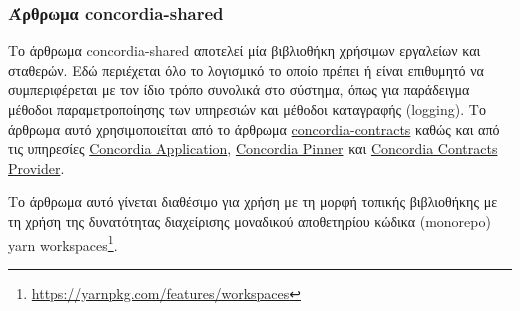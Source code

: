 \subsubsection{Άρθρωμα concordia-shared} \label{subsubsection:4-3-1-concordia-shared-unit}

Το άρθρωμα concordia-shared αποτελεί μία βιβλιοθήκη χρήσιμων εργαλείων και σταθερών. Εδώ περιέχεται όλο το λογισμικό το οποίο πρέπει ή είναι επιθυμητό να συμπεριφέρεται με τον ίδιο τρόπο συνολικά στο σύστημα, όπως για παράδειγμα μέθοδοι παραμετροποίησης των υπηρεσιών και μέθοδοι καταγραφής (logging). Το άρθρωμα αυτό χρησιμοποιείται από το άρθρωμα \hyperref[subsubsection:4-3-1-concordia-contracts-unit]{concordia-contracts} καθώς και από τις υπηρεσίες \hyperref[subsection:4-3-2-concordia-application-service]{Concordia Application}, \hyperref[subsection:4-3-4-concordia-pinner-service]{Concordia Pinner} και \hyperref[subsection:4-3-5-concordia-contracts-provider-service]{Concordia Contracts Provider}.

Το άρθρωμα αυτό γίνεται διαθέσιμο για χρήση με τη μορφή τοπικής βιβλιοθήκης με τη χρήση της δυνατότητας διαχείρισης μοναδικού αποθετηρίου κώδικα (monorepo) yarn workspaces{\footnote{\url{https://yarnpkg.com/features/workspaces}}}.